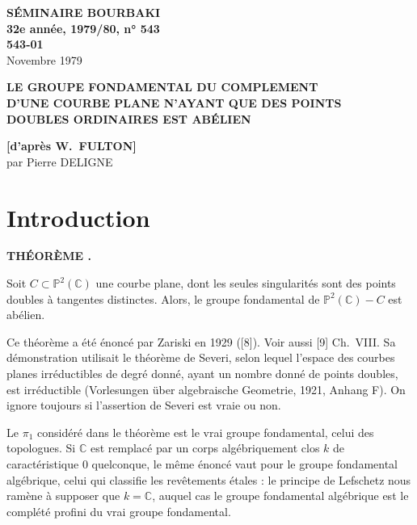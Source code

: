 \documentclass[12pt,a4paper]{article}
\newcounter{mainthm}
\newenvironment{maintheorem}[1][]{%
  \refstepcounter{mainthm}%
  \par\medskip\noindent\textbf{THÉORÈME \themainthm#1.}~\ignorespaces
}{\par\medskip}
\begin{document}
\setlength{\parindent}{0pt}
\setlength{\parskip}{0.5ex plus 0.2ex minus 0.1ex}

\begin{center}
\textbf{SÉMINAIRE BOURBAKI}\\
\textbf{32e année, 1979/80, n° 543}\\
\textbf{543-01}\\[1ex]
Novembre 1979
\end{center}

\begin{center}
\Large\bfseries
LE GROUPE FONDAMENTAL DU COMPLEMENT\\
D'UNE COURBE PLANE N'AYANT QUE DES POINTS\\
DOUBLES ORDINAIRES EST ABÉLIEN
\end{center}

\begin{center}
\textbf{[d'après W.\ FULTON]}\\[1ex]
par Pierre DELIGNE
\end{center}

\section*{Introduction}

\begin{maintheorem}
Soit $C \subset \mathbb{P}^2(\mathbb{C})$ une courbe plane, dont les seules singularités sont des points doubles à tangentes distinctes. Alors, le groupe fondamental de $\mathbb{P}^2(\mathbb{C}) - C$ est abélien.
\end{maintheorem}

Ce théorème a été énoncé par Zariski en 1929 ([8]). Voir aussi [9] Ch.\ VIII. Sa démonstration utilisait le théorème de Severi, selon lequel l'espace des courbes planes irréductibles de degré donné, ayant un nombre donné de points doubles, est irréductible (Vorlesungen über algebraische Geometrie, 1921, Anhang F). On ignore toujours si l'assertion de Severi est vraie ou non.

Le $\pi_1$ considéré dans le théorème est le vrai groupe fondamental, celui des topologues. Si $\mathbb{C}$ est remplacé par un corps algébriquement clos $k$ de caractéristique $0$ quelconque, le même énoncé vaut pour le groupe fondamental algébrique, celui qui classifie les revêtements étales : le principe de Lefschetz nous ramène à supposer que $k = \mathbb{C}$, auquel cas le groupe fondamental algébrique est le complété profini du vrai groupe fondamental.
\end{document}
